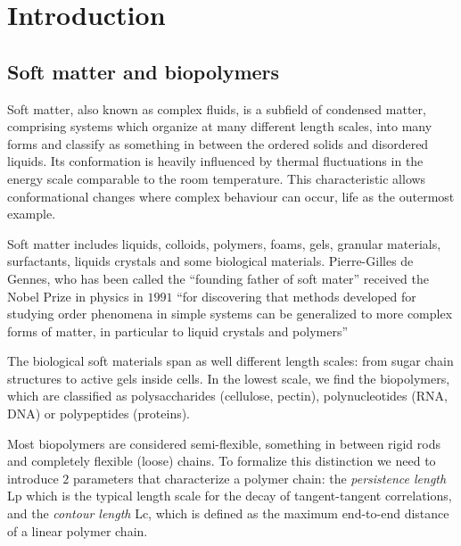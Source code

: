 
\chapter{Introduction} %

\label{Introduction} %

\section{Soft matter and biopolymers}
Soft matter, also known as complex fluids, is a subfield of condensed
matter, comprising systems which organize at many different length scales, into
many forms and classify as something in between the
ordered solids and disordered liquids. Its conformation is heavily
influenced by thermal fluctuations in the energy scale comparable to the room
temperature. This characteristic allows conformational changes where complex
behaviour can occur, life as the outermost example.


Soft matter includes liquids, colloids, polymers, foams, gels, granular
materials, surfactants, liquids crystals and some biological materials.
Pierre-Gilles de Gennes, who has been called the ``founding father of soft
mater'' received the Nobel Prize in physics in $1991$ ``for discovering that
methods developed for studying order phenomena in simple systems can be
generalized to more complex forms of matter, in particular to liquid  crystals
and polymers''\citep{de_gennes_pierre-gilles_????}

The biological soft materials span as well different length scales: from sugar
chain structures to active gels inside cells. In the
lowest scale, we find the biopolymers, which are classified as polysaccharides
(cellulose, pectin),  polynucleotides (RNA, DNA) or polypeptides (proteins).

Most biopolymers are considered semi-flexible, something in between
rigid rods and completely flexible (loose) chains.  To formalize this
distinction we need to introduce $2$ parameters that characterize a polymer
chain: the \emph{persistence length} \gls{Lp} which is the typical length scale
for the decay of tangent-tangent correlations, and the \emph{contour length}
\gls{Lc}, which is defined as the maximum end-to-end distance of a linear
polymer chain.

